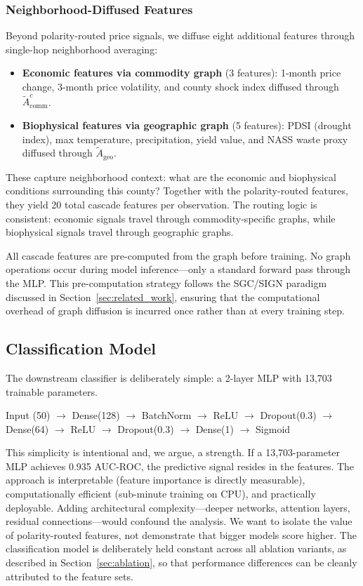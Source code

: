 \documentclass[preprint,12pt,authoryear]{elsarticle}
\begin{document}
\subsubsection{Neighborhood-Diffused Features}

Beyond polarity-routed price signals, we diffuse eight additional features through single-hop neighborhood averaging:

\begin{itemize}[leftmargin=*]
    \item \textbf{Economic features via commodity graph} (3 features): 1-month price change, 3-month price volatility, and county shock index diffused through $\tilde{A}_{\text{comm}}^{c}$.
    \item \textbf{Biophysical features via geographic graph} (5 features): PDSI (drought index), max temperature, precipitation, yield value, and NASS waste proxy diffused through $\tilde{A}_{\text{geo}}$.
\end{itemize}

These capture neighborhood context: what are the economic and biophysical conditions surrounding this county? Together with the polarity-routed features, they yield 20 total cascade features per observation. The routing logic is consistent: economic signals travel through commodity-specific graphs, while biophysical signals travel through geographic graphs.

All cascade features are pre-computed from the graph before training. No graph operations occur during model inference---only a standard forward pass through the MLP. This pre-computation strategy follows the SGC/SIGN paradigm discussed in Section~\ref{sec:related_work}, ensuring that the computational overhead of graph diffusion is incurred once rather than at every training step.

\subsection{Classification Model}
\label{sec:model}

The downstream classifier is deliberately simple: a 2-layer MLP with 13,703 trainable parameters.

\begin{center}
Input (50) $\to$ Dense(128) $\to$ BatchNorm $\to$ ReLU $\to$ Dropout(0.3) $\to$ Dense(64) $\to$ ReLU $\to$ Dropout(0.3) $\to$ Dense(1) $\to$ Sigmoid
\end{center}

This simplicity is intentional and, we argue, a strength. If a 13,703-parameter MLP achieves 0.935 AUC-ROC, the predictive signal resides in the features. The approach is interpretable (feature importance is directly measurable), computationally efficient (sub-minute training on CPU), and practically deployable. Adding architectural complexity---deeper networks, attention layers, residual connections---would confound the analysis. We want to isolate the value of polarity-routed features, not demonstrate that bigger models score higher. The classification model is deliberately held constant across all ablation variants, as described in Section~\ref{sec:ablation}, so that performance differences can be cleanly attributed to the feature sets.
\end{document}

